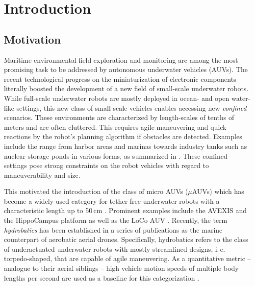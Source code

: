 \chapter{Introduction}\label{chap:introduction}

\section{Motivation}
Maritime environmental field exploration and monitoring are among the most promising task to be addressed by autonomous underwater vehicles (AUVs).
The recent technological progress on the miniaturization of electronic components literally boosted the development of a new field of small-scale underwater robots.
While full-scale underwater robots are mostly deployed in ocean- and open water-like settings, this new class of small-scale vehicles enables accessing new \textit{confined} scenarios.
These environments are characterized by length-scales of tenths of meters and are often cluttered. 
This requires agile maneuvering and quick reactions by the robot’s planning algorithm if obstacles are detected.
Examples include the range from harbor areas and marinas towards industry tanks such as nuclear storage ponds in various forms, as summarized in \cite{Watson2020}.
These confined settings pose strong constraints on the robot vehicles with regard to maneuverability and size.

This motivated the introduction of the class of micro AUVs ($\mu$AUVs) which has become a widely used category for tether-free underwater robots with a characteristic length up to 50\,cm \cite{micro-auv}.
Prominent examples include the AVEXIS \cite{Griffiths2016} and the HippoCampus platform \cite{duecker2020hippocampusx} as well as the LoCo AUV \cite{Edge2020}.
Recently, the term \textit{hydrobatics} has been established in a series of publications \cite{DueckerEtAl18, Duecker20, duecker2021aerobatics} as the marine counterpart of aerobatic aerial drones.
Specifically, hydrobatics refers to the class of underactuated underwater robots with mostly streamlined designs, i.\,e. torpedo-shaped, that are capable of agile maneuvering.
As a quantitative metric  -- analogue to their aerial siblings -- high vehicle motion speeds of multiple body lengths per second are used as a baseline for this categorization \cite{duecker2021aerobatics}.


